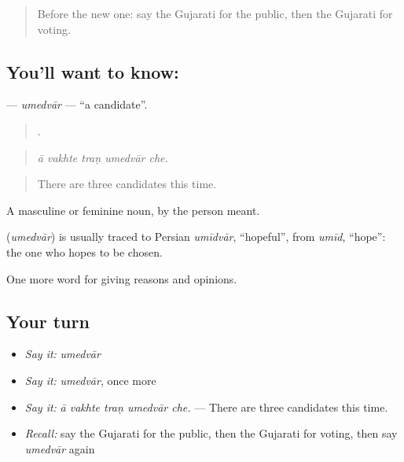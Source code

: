 \label{lesson:GU-C353-umedvar}



\begin{quote}
Before the new one: say the Gujarati for the public, then the Gujarati for voting.
\end{quote}

\subsection*{You'll want to know: }
\textbf{} — \emph{umedvār} — \textquotedblleft{}a candidate\textquotedblright{}.

\begin{quote}
    .
\end{quote}

\begin{quote}
\emph{ā vakhte traṇ umedvār che.}
\end{quote}

\begin{quote}
There are three candidates this time.
\end{quote}

A masculine or feminine noun, by the person meant.

\begin{cousinweb}
\textbf{} (\emph{umedvār}) is usually traced to Persian \emph{umīdvār}, \textquotedblleft{}hopeful\textquotedblright{}, from \emph{umīd}, \textquotedblleft{}hope\textquotedblright{}: the one who hopes to be chosen.
\end{cousinweb}

\begin{grammarlens}[title={What you've built}]
One more word for giving reasons and opinions.
\end{grammarlens}

\subsection*{Your turn}
\begin{itemize}
\raggedright
  \item \emph{Say it:} \emph{umedvār}
  \item \emph{Say it:} \emph{umedvār}, once more
  \item \emph{Say it:} \emph{ā vakhte traṇ umedvār che.} — There are three candidates this time.
  \item \emph{Recall:} say the Gujarati for the public, then the Gujarati for voting, then say \emph{umedvār} again
\end{itemize}

